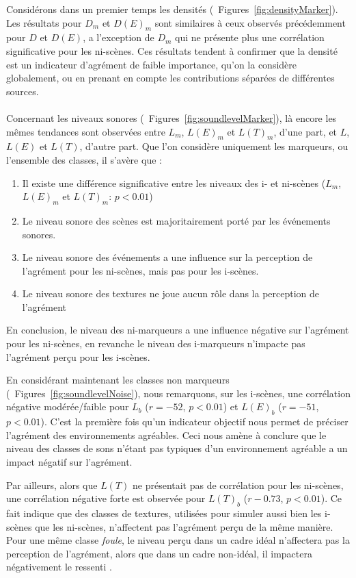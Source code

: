 Considérons dans un premier temps les densités (\cf~Figures~\ref{fig:densityMarker}). Les résultats pour $D_m$ et $D(E)_m$ sont similaires à ceux observés précédemment pour $D$ et $D(E)$, a l'exception de $D_m$  qui ne présente plus une corrélation significative pour les ni-scènes. Ces résultats tendent à confirmer que la densité est un indicateur d'agrément de faible importance, qu'on la considère globalement, ou en prenant en compte les contributions séparées de différentes sources. \\

 \\

Concernant les niveaux sonores (\cf~Figures~\ref{fig:soundlevelMarker}), là encore les mêmes tendances sont observées entre $L_m$, $L(E)_m$ et $L(T)_m$, d'une part, et $L$, $L(E)$ et $L(T)$, d'autre part. Que l'on considère uniquement les marqueurs, ou l'ensemble des classes, il s'avère que :

\begin{enumerate}
\item Il existe une différence significative entre les niveaux des i- et ni-scènes ($L_m$, $L(E)_m$ et $L(T)_m$: $p<0.01$) 
\item Le niveau sonore des scènes est majoritairement porté par les événements sonores.
\item Le niveau sonore des événements a une influence sur la perception de l'agrément pour les ni-scènes, mais pas pour les i-scènes.
\item Le niveau sonore des textures ne joue aucun rôle dans la perception de l'agrément
\end{enumerate}

En conclusion, le niveau des ni-marqueurs a une influence négative sur l'agrément pour les ni-scènes, en revanche le niveau des i-marqueurs n’impacte pas l'agrément perçu pour les i-scènes.

En considérant maintenant les classes non marqueurs  (\cf~Figures~\ref{fig:soundlevelNoise}), nous remarquons, sur les i-scènes, une corrélation négative modérée/faible pour $L_b$  ($r=-52$, $p<0.01$) et $L(E)_b$ ($r=-51$, $p<0.01$). C'est la première fois qu'un indicateur objectif nous permet de préciser l'agrément des environnements agréables. Ceci nous amène à conclure que le niveau des classes de sons n'étant pas typiques d'un environnement agréable a un impact négatif sur l'agrément. 

Par ailleurs, alors que $L(T)$ ne présentait pas de corrélation pour les ni-scènes, une corrélation négative forte est observée pour $L(T)_b$ ($r-0.73$, $p<0.01$). Ce fait indique que des classes de textures, utilisées pour simuler aussi bien les i-scènes que les ni-scènes, n'affectent pas l'agrément perçu de la même manière. Pour une même classe \emph{foule}, le niveau perçu dans un cadre idéal n'affectera pas la perception de l'agrément, alors que dans un cadre non-idéal, il impactera négativement le ressenti .

